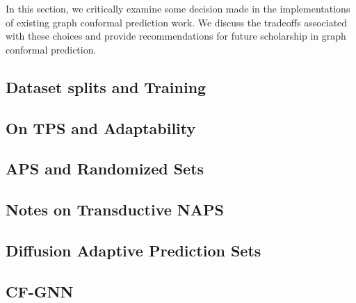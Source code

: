 In this section, we critically examine some decision made in the implementations of existing graph conformal prediction work.
We discuss the tradeoffs associated with these choices and provide recommendations for future scholarship in graph conformal prediction.

\subsection{Dataset splits and Training}



\subsection{On TPS and Adaptability}


\subsection{APS and Randomized Sets}


\subsection{Notes on Transductive NAPS}


\subsection{Diffusion Adaptive Prediction Sets}


\subsection{CF-GNN}

